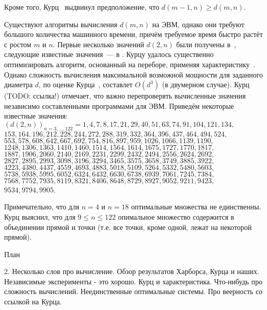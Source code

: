 Кроме того, Курц~\cite{kurz2008bounds} выдвинул предположение, что $d(m - 1, n) \geq d(m, n)$.




Существуют алгоритмы вычисления $d(m,n)$ на ЭВМ, однако они требуют большого количества машинного времени,
причём требуемое время быстро растёт с ростом $m$ и $n$.
Первые несколько значений $d(2,n)$ были получены в~\cite{harborth1998integral},
следующие известные значения~--- в \cite{kurz2005characteristic,kurz2006konstruktion,kurz2008minimum,kurz2008bounds,our-mz-rus}.
Курцу удалось существенно оптимизировать алгоритм, основанный на переборе, применяя характеристику~\cite{kurz2005characteristic,kreisel2008heptagon}.
Однако сложность вычисления максимальной возможной мощности для заданного диаметра $d$, по оценке Курца~\cite{kreisel2008heptagon},
составлет $O(d^3)$ (в двумерном случае).
Курц (TODO: ссылка!) отмечает, что важно перепроверять вычисленные значения независимо составленными программами для ЭВМ.
Приведём некоторые известные значения:
\\
$
(d(2, n))_{n=3,...,122} = 1, 4, 7, 8, 17, 21, 29, 40, 51, 63, 74, 91, 104, 121,
134, $\\$153, 164,
196, 212, 228, 244, 272, 288, 319, 332, 364, 396, 437, 464, 494, 524,$\\$ 553, 578, 608,
642, 667, 692, 754, 816, 897, 959, 1026, 1066, 1139, 1190, $\\$ 1248, 1306, 1363, 1410,
1460, 1514, 1564, 1614, 1675, 1727, 1770, 1817, $\\$1887, 1906, 2060, 2140, 2169,
2231, 2299, 2432, 2494, 2556, 2624, 2692, $\\$2827, 2895, 2993, 3098, 3196, 3294,
3465, 3575, 3658, 3749, 3885, 3922, $\\$4223, 4380, 4437, 4559, 4693, 4883,
5018, 5109, 5264, 5332, 5480, 5603, $\\$5738, 5938, 5995, 6052,
6324, 6432, 6630, 6738, 6939, 7061, 7245, 7384, $\\$7568, 7752, 7935, 8119, 8321,
8406, 8648, 8729, 8927, 9052, 9211, 9423, $\\$9534, 9794, 9905
$.

Примечательно, что для $n=4$ и $n=18$ оптимальные множества не единственны.
Курц выяснил, что для $9 \leq n \leq 122$ опимальное множество содержится
в объединении прямой и точки (т.е. все точки, кроме одной, лежат на некоторой прямой).



План

2. Несколько слов про вычисление. Обзор результатов Харборса, Курца и наших.
Независимые эксперименты - это хорошо. Курц и характеристика. Что-нибудь про сложность вычислений.
Неединственные оптимальные системы. Про веерность со ссылкой на Курца.


